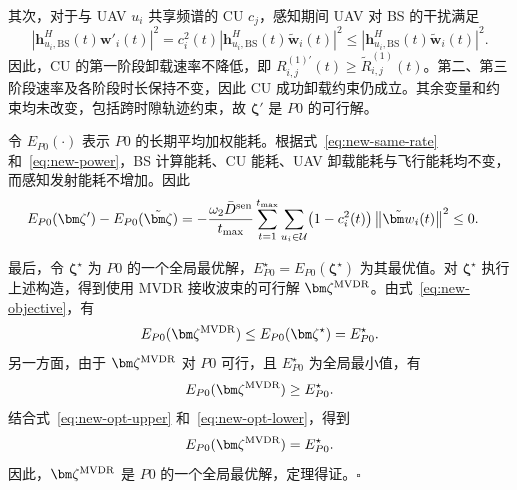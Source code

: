 其次，对于与 UAV $u_i$ 共享频谱的 CU $c_j$，感知期间 UAV 对 BS 的干扰满足
\begin{equation}\label{eq:new-interference}
\left|\bm h_{u_i,\mathrm{BS}}^H(t)\bm w'_i(t)\right|^2
=c_i^2(t)\left|\bm h_{u_i,\mathrm{BS}}^H(t)\tilde{\bm w}_i(t)\right|^2
\le\left|\bm h_{u_i,\mathrm{BS}}^H(t)\tilde{\bm w}_i(t)\right|^2.
\end{equation}
因此，CU 的第一阶段卸载速率不降低，即 $R_{i,j}^{(1)\prime}(t)\ge\tilde R_{i,j}^{(1)}(t)$。第二、第三阶段速率及各阶段时长保持不变，因此 CU 成功卸载约束仍成立。其余变量和约束均未改变，包括跨时隙轨迹约束，故 $\bm\zeta'$ 是 $P0$ 的可行解。

令 $E_{P0}(\cdot)$ 表示 $P0$ 的长期平均加权能耗。根据式~\eqref{eq:new-same-rate} 和~\eqref{eq:new-power}，BS 计算能耗、CU 能耗、UAV 卸载能耗与飞行能耗均不变，而感知发射能耗不增加。因此
\begin{align}\label{eq:new-objective}
E_{P0}(\bm\zeta')-E_{P0}(\tilde{\bm\zeta})
&=-\frac{\omega_2\bar D^{\rm sen}}{t_{\max}}
\sum_{t=1}^{t_{\max}}\sum_{u_i\in\mathcal U}
\bigl(1-c_i^2(t)\bigr)\left\|\tilde{\bm w}_i(t)\right\|^2
\le0.
\end{align}

最后，令 $\bm\zeta^\star$ 为 $P0$ 的一个全局最优解，$E_{P0}^\star=E_{P0}(\bm\zeta^\star)$ 为其最优值。对 $\bm\zeta^\star$ 执行上述构造，得到使用 MVDR 接收波束的可行解 $\bm\zeta^{\rm MVDR}$。由式~\eqref{eq:new-objective}，有
\begin{equation}\label{eq:new-opt-upper}
E_{P0}(\bm\zeta^{\rm MVDR})\le E_{P0}(\bm\zeta^\star)=E_{P0}^\star.
\end{equation}
另一方面，由于 $\bm\zeta^{\rm MVDR}$ 对 $P0$ 可行，且 $E_{P0}^\star$ 为全局最小值，有
\begin{equation}\label{eq:new-opt-lower}
E_{P0}(\bm\zeta^{\rm MVDR})\ge E_{P0}^\star.
\end{equation}
结合式~\eqref{eq:new-opt-upper} 和~\eqref{eq:new-opt-lower}，得到
\begin{equation}
E_{P0}(\bm\zeta^{\rm MVDR})=E_{P0}^\star.
\end{equation}
因此，$\bm\zeta^{\rm MVDR}$ 是 $P0$ 的一个全局最优解，定理得证。\hfill$\square$

